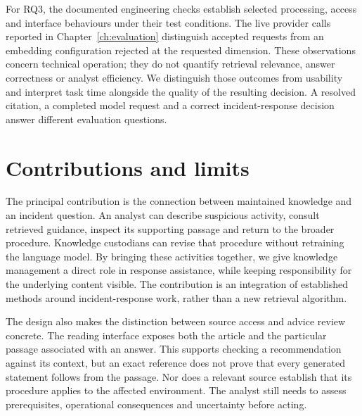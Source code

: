 For RQ3, the documented engineering checks establish selected processing, access and interface behaviours under their test conditions. The live provider calls reported in Chapter~\ref{ch:evaluation} distinguish accepted requests from an embedding configuration rejected at the requested dimension. These observations concern technical operation; they do not quantify retrieval relevance, answer correctness or analyst efficiency. We distinguish those outcomes from usability and interpret task time alongside the quality of the resulting decision. A resolved citation, a completed model request and a correct incident-response decision answer different evaluation questions.

\section{Contributions and limits}
The principal contribution is the connection between maintained knowledge and an incident question. An analyst can describe suspicious activity, consult retrieved guidance, inspect its supporting passage and return to the broader procedure. Knowledge custodians can revise that procedure without retraining the language model. By bringing these activities together, we give knowledge management a direct role in response assistance, while keeping responsibility for the underlying content visible. The contribution is an integration of established methods around incident-response work, rather than a new retrieval algorithm.

The design also makes the distinction between source access and advice review concrete. The reading interface exposes both the article and the particular passage associated with an answer. This supports checking a recommendation against its context, but an exact reference does not prove that every generated statement follows from the passage. Nor does a relevant source establish that its procedure applies to the affected environment. The analyst still needs to assess prerequisites, operational consequences and uncertainty before acting.

